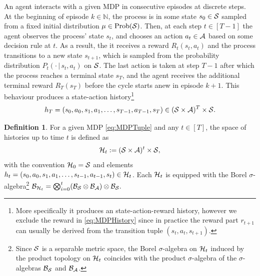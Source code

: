 \documentclass[
    a4paper,
    11pt,
    bibliography=totoc,
    listof=totoc,      
    headinclude=true,
    cleardoublepage=empty,
]{scrbook}
\theoremstyle{plain}
\theoremstyle{definition}
\newtheorem{definition}[theorem]{Definition}
\theoremstyle{remark}
\newcommand{\SetN}{\mathbb N}
\newcommand{\SpaceS}{{\cal S}}
\newcommand{\SpaceA}{{\cal A}}
\newcommand{\SpaceH}{{\cal H}}
\begin{document}
An agent interacts with a given MDP in consecutive episodes at discrete steps. 
At the beginning of episode $k\in\SetN$, the process is in some state 
$s_0\in\SpaceS$ sampled from a fixed initial distribution $\mu \in 
\text{Prob}(\SpaceS)$. Then, at each step $t\in[T-1]$ the agent observes the 
process' state $s_t$, and chooses an action $a_t\in\SpaceA$ based on some 
decision rule at $t$. As a result, the it receives a reward $R_t(s_t, a_t)$ 
and the process transitions to a new state $s_{t+1}$, which is sampled from 
the probability distribution $P_t(\cdot\,|\,s_t,a_t)$ on $\SpaceS$. The last
action is taken at step $T-1$ after which the process reaches a terminal
state $s_T$, and the agent receives the additional terminal reward $R_T(s_T)$
before the cycle starts anew in episode $k+1$. 
This behaviour produces a state-action history\footnote{
    More specifically it produces an state-action-reward history, however we
    exclude the reward in \eqref{eq:MDPHistory} since in practice the reward
    part $r_{t+1}$ can usually be derived from the transition tuple 
    $(s_t,a_t,s_{t+1})$.
}
\begin{equation}
    \label{eq:MDPHistory}
    h_T = (s_0, a_0, s_1, a_1, \dots, s_{T-1}, a_{T-1}, s_T) 
        \in (\SpaceS \times \SpaceA)^{T} \times \SpaceS.
\end{equation}

\begin{definition}
    For a given MDP \eqref{eq:MDPTuple} and any $t\in[T]$, the space of
    histories up to time $t$ is defined as 
    \[
        \SpaceH_t := (\SpaceS \times \SpaceA)^{t} \times \SpaceS, 
    \]
    with the convention $\SpaceH_0=\SpaceS$ and elements $h_t = (s_0,a_0, s_1, a_1, \dots, s_{t-1}, a_{t-1}, s_t) \in \SpaceH_t$. Each $\SpaceH_t$ is equipped with the 
    Borel $\sigma$-algebra\footnote{
        Since $\SpaceS$ is a separable metric space, the Borel $\sigma$-algebra on $\SpaceH_t$ induced by the product topology on $\SpaceH_t$ coincides with the product $\sigma$-algebra of the $\sigma$-algebras $\mathcal{B}_\SpaceS$ and $\mathcal{B}_\SpaceA$. 
    } 
    $
    \mathcal{B}_{\SpaceH_t} 
        = \bigotimes_{i=0}^t(
            \mathcal{B}_\SpaceS \otimes \mathcal{B}_\SpaceA 
        ) \otimes \mathcal{B}_\SpaceS.
    $
\end{definition}
\end{document}
